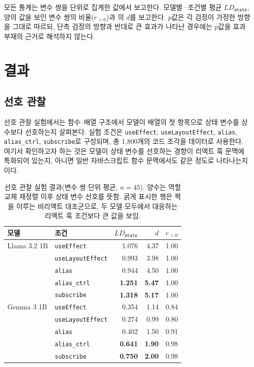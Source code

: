 \documentclass[11pt]{article}
\begin{document}
모든 통계는 변수 쌍을 단위로 집계한 값에서 보고한다.
모델별·조건별 평균 $LD_{\texttt{state}}$, 양의 값을 보인 변수 쌍의 비율($r_{>0}$)과 의 $d$를 보고한다.
$p$값은 각 검정이 가정한 방향을 그대로 따르되, 단측 검정의 방향과 반대로 큰 효과가 나타난 경우에는 $p$값을 효과 부재의 근거로 해석하지 않는다.

\section{결과}
\label{sec:results}
\subsection{선호 관찰}
\label{sec:results-pref}

선호 관찰 실험에서는 함수--배열 구조에서 모델이 배열의 첫 항목으로 상태 변수를 상수보다 선호하는지 살펴본다.
실험 조건은 \texttt{useEffect}, \texttt{useLayoutEffect}, \texttt{alias}, \texttt{alias\_ctrl}, \texttt{subscribe}로 구성되며, 총 1,800개의 코드 조각을 데이터로 사용한다.
여기서 확인하고자 하는 것은 모델이 상태 변수를 선호하는 경향이 리액트 훅 문맥에 특화되어 있는지, 아니면 일반 자바스크립트 함수 문맥에서도 같은 정도로 나타나는지이다.

\begin{table}[t]
\centering
\small
\begin{supertabular}{llrrr}
  \toprule
  \textbf{모델} & \textbf{조건} & $LD_{\texttt{state}}$ & \textbf{$d$} & $r_{>0}$ \\
  \midrule
  Llama 3.2 1B & \texttt{useEffect} & 1.076 & 4.37 & 1.00 \\
  & \texttt{useLayoutEffect} & 0.993 & 3.98 & 1.00 \\
  & \texttt{alias} & 0.944 & 4.50 & 1.00 \\
  & \texttt{alias\_ctrl} & \textbf{1.251} & \textbf{5.47} & 1.00 \\
  & \texttt{subscribe} & \textbf{1.318} & \textbf{5.17} & 1.00 \\
  \midrule
  Gemma 3 1B & \texttt{useEffect} & 0.354 & 1.14 & 0.84 \\
  & \texttt{useLayoutEffect} & 0.274 & 0.99 & 0.80 \\
  & \texttt{alias} & 0.402 & 1.50 & 0.91 \\
  & \texttt{alias\_ctrl} & \textbf{0.641} & \textbf{1.90} & 0.98 \\
  & \texttt{subscribe} & \textbf{0.750} & \textbf{2.00} & 0.98 \\
  \bottomrule
\end{supertabular}
\caption{선호 관찰 실험 결과(변수 쌍 단위 평균, $n=45$). 양수는 역할 교체 재정렬 이후 상태 변수 선호를 뜻함. 굵게 표시한 행은 짝을 이루는 비리액트 대조군으로, 두 모델 모두에서 대응하는 리액트 훅 조건보다 큰 값을 보임.}
\label{tab:results-pref}
\end{table}
\end{document}
